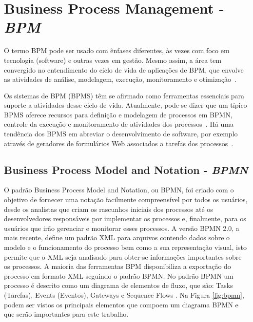\documentclass[12pt]{article}
\begin{document}
\section{Business Process Management - \emph{BPM}}

O termo BPM pode ser usado com ênfases diferentes, às vezes com foco em tecnologia (software) e outras vezes em gestão. Mesmo assim, a área tem convergido no entendimento do ciclo de vida de aplicações de BPM, que envolve as atividades de análise, modelagem, execução, monitoramento e otimização~\cite{ABPMP}. 

Os sistemas de BPM (BPMS) têm se afirmado como ferramentas essenciais para suporte a atividades desse ciclo de vida. Atualmente, pode-se dizer que um típico BPMS oferece recursos para definição e modelagem de processos em BPMN, controle da execução e monitoramento de atividades dos processos~\cite{forrester}. Há uma tendência dos BPMS em abreviar o desenvolvimento de software, por exemplo através de geradores de formulários Web associados a tarefas dos processos~\cite{greenresearch}. 

\subsection{Business Process Model and Notation - \emph{BPMN}}
O padrão Business Process Model and Notation, ou BPMN, foi criado com o objetivo de fornecer uma notação facilmente compreensível por todos os usuários, desde os analistas que criam os rascunhos iniciais dos processos até os desenvolvedores responsáveis por implementar os processos e, finalmente, para os usuários que irão gerenciar e monitorar esses processos\cite{model2011notation}. A versão BPMN 2.0, a mais recente, define um padrão XML para arquivos contendo dados sobre o modelo e o funcionamento do processo bem como a sua representação visual\cite{kurzdiagram}, isto permite que o XML seja analisado para obter-se informações importantes sobre os processos. A maioria das ferramentas BPM disponibiliza a exportação do processo em formato XML seguindo o padrão BPMN. No padrão BPMN um processo é descrito como um diagrama de elementos de fluxo, que são: Tasks (Tarefas), Events (Eventos), Gateways e Sequence Flows \cite{kurzdiagram}. Na Figura \ref{fig:bpmn}, podem ser vistos os principais elementos que compoem um diagrama BPMN e que serão importantes para este trabalho.
\end{document}
